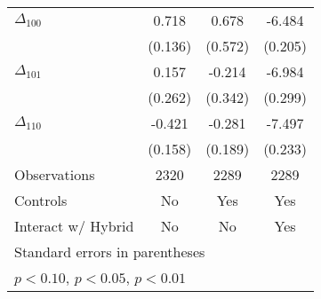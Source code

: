 {\begin{tabular}{l*{3}{c}}
$\Delta_{100}$&    0.718\sym{***}&    0.678         &   -6.484\sym{***}\\
          &  (0.136)         &  (0.572)         &  (0.205)         \\
$\Delta_{101}$&    0.157         &   -0.214         &   -6.984\sym{***}\\
          &  (0.262)         &  (0.342)         &  (0.299)         \\
$\Delta_{110}$&   -0.421\sym{***}&   -0.281         &   -7.497\sym{***}\\
          &  (0.158)         &  (0.189)         &  (0.233)         \\
\hline
Observations&     2320         &     2289         &     2289         \\
Controls  &       No         &      Yes         &      Yes         \\
Interact w/ Hybrid&       No         &       No         &      Yes         \\
\hline\hline
\multicolumn{4}{l}{\footnotesize Standard errors in parentheses}\\
\multicolumn{4}{l}{\footnotesize \sym{*} \(p<0.10\), \sym{**} \(p<0.05\), \sym{***} \(p<0.01\)}\\
\end{tabular}
}
